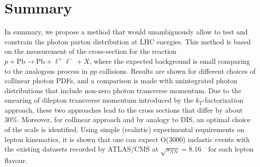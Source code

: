 \section{Summary}

In summary, we propose a method that would unambiguously allow to test and constrain the photon parton distribution at LHC energies.
This method is based on the measurement of the cross-section for the reaction $p+\textrm{Pb}\rightarrow \textrm{Pb} + \ell^+\ell^- + X$, where the expected background is small comparing to the analogous process in $pp$ collisions. 
Results are shown for different choices of collinear photon PDFs, and a comparison is made with unintegrated photon distributions that include non-zero photon transverse momentum.
Due to the smearing of dilepton transverse momentum introduced by the $k_T$-factorization approach, these two approaches lead to the cross sections that differ by about 30\%.
Moreover, for collinear approach and  by analogy to DIS, an optimal choice of the scale is identified.
Using simple (realistic) experimental requirements on lepton kinematics, it is shown that one can expect O(3000) inelastic events with the existing datasets recorded by ATLAS/CMS at $\sqrt{s_{N N}} = 8.16$~\TeV\ for each lepton flavour.
